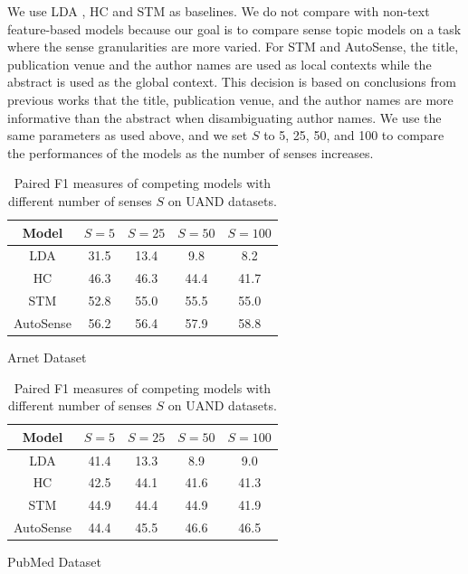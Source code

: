 \documentclass[letterpaper]{article} %
\begin{document}
We use LDA \cite{blei2003latent}, HC \cite{chang2014inducing} and STM \cite{wang2015sense} as baselines. We do not compare with non-text feature-based models \cite{tang2012unified,cen2013author} because our goal is to compare sense topic models on a task where the sense granularities are more varied. For STM and AutoSense, the title, publication venue and the author names are used as local contexts while the abstract is used as the global context. This decision is based on conclusions from previous works \cite{tang2012unified} that the title, publication venue, and the author names are more informative than the abstract when disambiguating author names. We use the same parameters as used above, and we set $S$ to 5, 25, 50, and 100 to compare the performances of the models as the number of senses increases.

\begin{table}[]
    \centering
    \begin{subtable}{0.47\textwidth}
    \centering
    \begin{tabular}{|c|cccc|}
        \hline
        Model & $S=5$ & $S=25$ & $S=50$ & $S=100$ \\
        \hline
        LDA & 31.5 & 13.4 & 9.8 & 8.2 \\
        HC & 46.3 & 46.3 & 44.4 & 41.7 \\
        STM & 52.8 & 55.0 & 55.5 & 55.0 \\
        AutoSense & 56.2 & 56.4 & 57.9 & 58.8 \\
        \hline
    \end{tabular}
    \caption{Arnet Dataset}
    \end{subtable}
	\newline
    \vspace*{2pt}
    \newline
    \begin{subtable}{0.47\textwidth}
    \centering
    \begin{tabular}{|c|cccc|}
        \hline
        Model & $S=5$ & $S=25$ & $S=50$ & $S=100$ \\
        \hline
        LDA & 41.4 & 13.3 & 8.9 & 9.0 \\
        HC & 42.5 & 44.1 & 41.6 & 41.3 \\
        STM & 44.9 & 44.4 & 44.9 & 41.9 \\
        AutoSense & 44.4 & 45.5 & 46.6 & 46.5 \\
        \hline
    \end{tabular}
    \caption{PubMed Dataset}
    \end{subtable}
    \caption{Paired F1 measures of competing models with different number of senses $S$ on UAND datasets.}
	\label{fig:andresults}
\end{table}
\end{document}
